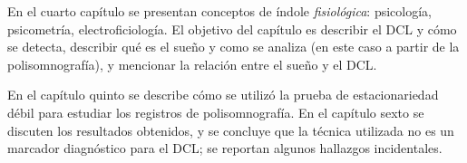 
En el cuarto capítulo se presentan conceptos de índole \textit{fisiológica}: psicología, psicometría, electroficiología.
%
El objetivo del capítulo es describir el DCL y cómo se detecta, describir qué es el sueño y como se analiza (en este caso a partir de la polisomnografía), y mencionar la relación entre el sueño y el DCL.


En el capítulo quinto se describe cómo se utilizó la prueba de estacionariedad débil para estudiar los registros de polisomnografía.
%
En el capítulo sexto se discuten los resultados obtenidos, y se concluye que la técnica utilizada no es un marcador diagnóstico para el DCL; se reportan algunos hallazgos incidentales.


%
%
%

